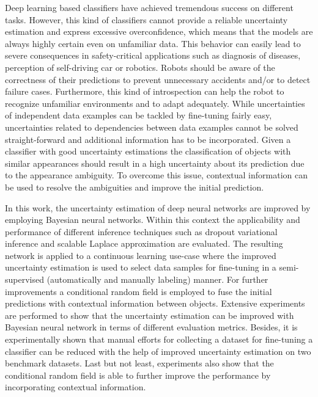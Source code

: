 Deep learning based classifiers have achieved tremendous success on different tasks. 
However, this kind of classifiers cannot provide a reliable uncertainty estimation and express excessive overconfidence, which means that the models are always highly certain even on unfamiliar data.
This behavior can easily lead to severe consequences in safety-critical applications such as diagnosis of diseases, perception of self-driving car or robotics. 
Robots should be aware of the correctness of their predictions to prevent unnecessary accidents and/or to detect failure cases.
Furthermore, this kind of introspection can help the robot to recognize unfamiliar environments and to adapt adequately.
While uncertainties of independent data examples can be tackled by fine-tuning fairly easy, uncertainties related to dependencies between data examples cannot be solved straight-forward and additional information has to be incorporated.
Given a classifier with good uncertainty estimations the classification of objects with similar appearances should result in a high uncertainty about its prediction due to the appearance ambiguity. To overcome this issue, contextual information can be used to resolve the ambiguities and improve the initial prediction.

In this work, the uncertainty estimation of deep neural networks are improved by employing Bayesian neural networks. 
Within this context the applicability and performance of different inference techniques such as dropout variational inference and scalable Laplace approximation are evaluated.
The resulting network is applied to a continuous learning use-case where the improved uncertainty estimation is used to select data samples for fine-tuning in a semi-supervised (automatically and manually labeling) manner.
For further improvements a conditional random field is employed to fuse the initial predictions with contextual information between objects.
Extensive experiments are performed to show that the uncertainty estimation can be improved with Bayesian neural network in terms of different evaluation metrics.
Besides, it is experimentally shown that manual efforts for collecting a dataset for fine-tuning a classifier can be reduced with the help of improved uncertainty estimation on two benchmark datasets. 
Last but not least, experiments also show that the conditional random field is able to further improve the performance by incorporating contextual information.

\switchlanguage{\lang} %
